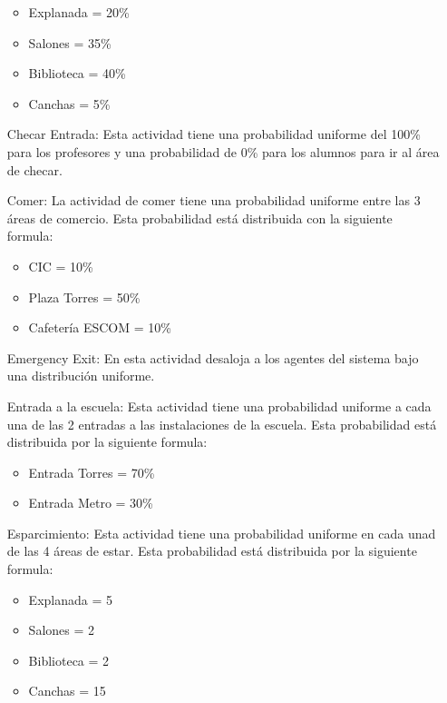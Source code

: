 \documentclass[a4paper,10pt]{article}
\begin{document}
\begin{enumerate}
\begin{itemize}
 \item Explanada = 20\%

 \item Salones = 35\%

 \item Biblioteca = 40\%

 \item Canchas = 5\%
 
\end{itemize}

 \item[Checar Entrada:]Esta actividad tiene una probabilidad uniforme del 100\% para los profesores y una probabilidad de 0\% para los alumnos para ir al \'area de checar.
 \item[Comer:]La actividad de comer tiene una probabilidad uniforme entre las 3 \'areas de comercio. Esta probabilidad est\'a distribuida con la siguiente formula:
\begin{itemize}
 \item CIC = 10\%

 \item Plaza Torres = 50\%

 \item Cafeter\'ia ESCOM = 10\% 
\end{itemize}


 \item[Emergency Exit:]En esta actividad desaloja a los agentes del sistema bajo una distribuci\'on uniforme. 
 \item[Entrada a la escuela:]Esta actividad tiene una probabilidad uniforme a cada una de las 2 entradas a las instalaciones de la escuela. Esta probabilidad est\'a distribuida  por la siguiente formula:

\begin{itemize}
 \item Entrada Torres = 70\%

 \item Entrada Metro = 30\% 
\end{itemize}


 \item[Esparcimiento:]Esta actividad tiene una probabilidad uniforme en cada unad de las 4 \'areas de estar. Esta probabilidad est\'a distribuida por la siguiente formula:

\begin{itemize}
 \item Explanada = 5%

 \item Salones = 2%

 \item Biblioteca = 2%

 \item Canchas = 15%
 
 \end{itemize}

\end{enumerate}
\end{document}
